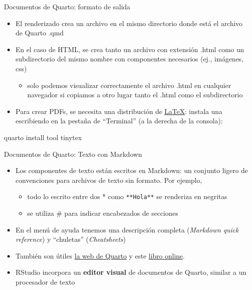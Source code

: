 \documentclass[
  10pt,
  ignorenonframetext,
]{beamer}
\newenvironment{Shaded}{\begin{snugshade}}{\end{snugshade}}
\newcommand{\NormalTok}[1]{\textcolor[rgb]{0.00,0.23,0.31}{#1}}
\providecommand{\tightlist}{%
  \setlength{\itemsep}{0pt}\setlength{\parskip}{0pt}}\usepackage{longtable,booktabs,array}
\begin{document}
\begin{frame}[fragile]{Documentos de Quarto: formato de salida}
\label{documentos-de-quarto-formato-de-salida}
\begin{itemize}
\item
  El renderizado crea un archivo en el mismo directorio donde está el
  archivo de Quarto .qmd
\item
  En el caso de HTML, se crea tanto un archivo con extensión .html como
  un subdirectorio del mismo nombre con componentes necesarios (ej.,
  imágenes, css)

  \begin{itemize}
  \tightlist
  \item
    solo podemos visualizar correctamente el archivo .html en cualquier
    navegador si copiamos a otro lugar tanto el .html como el
    subdirectorio
  \end{itemize}
\item
  Para crear PDFs, se necesita una distribución de
  \href{https://es.wikipedia.org/wiki/LaTeX}{LaTeX}: instala una
  escribiendo en la pestaña de ``Terminal'' (a la derecha de la
  consola):
\end{itemize}

\begin{Shaded}
\begin{Highlighting}[]
\NormalTok{quarto install tool tinytex}
\end{Highlighting}
\end{Shaded}
\end{frame}

\begin{frame}[fragile]{Documentos de Quarto: Texto con Markdown}
\label{documentos-de-quarto-texto-con-markdown}
\begin{itemize}
\item
  Los componentes de texto están escritos en Markdown: un conjunto
  ligero de convenciones para archivos de texto sin formato. Por
  ejemplo,

  \begin{itemize}
  \item
    todo lo escrito entre dos * como \texttt{**Hola**} se renderiza en
    negritas
  \item
    se utiliza \# para indicar encabezados de secciones
  \end{itemize}
\item
  En el menú de ayuda tenemos una descripción completa (\emph{Markdown
  quick reference}) y ``chuletas'' (\emph{Cheatsheets})
\item
  También son útiles
  \href{https://quarto.org/docs/authoring/markdown-basics.html}{la web
  de Quarto} y este \href{https://bookdown.org/yihui/rmarkdown/}{libro
  online}.
\end{itemize}

\begin{itemize}
\tightlist
\item
  RStudio incorpora un \textbf{editor visual} de documentos de Quarto,
  similar a un procesador de texto
\end{itemize}
\end{frame}
\end{document}
